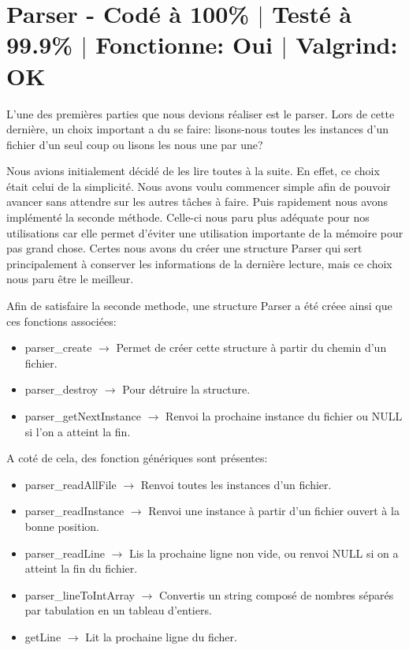 \documentclass{EPUProjetPeiP}
\newcommand{\comp}[5]{
	\section[#1]{#1 {\small - Codé à #2\% $\vert$ Testé à #3\% $\vert$ Fonctionne: #4 $\vert$ Valgrind: #5}}
}
\begin{document}
\comp{Parser}{100}{99.9}{Oui}{OK}
L'une des premières parties que nous devions réaliser est le parser. Lors de cette dernière, un choix important a du se faire: lisons-nous toutes les instances d'un fichier d'un seul coup ou lisons les nous une par une?

Nous avions initialement décidé de les lire toutes à la suite. En effet, ce choix était celui de la simplicité. Nous avons voulu commencer simple afin de pouvoir avancer sans attendre sur les autres tâches à faire. Puis rapidement nous avons implémenté la seconde méthode. Celle-ci nous paru plus adéquate pour nos utilisations car elle permet d'éviter une utilisation importante de la mémoire pour pas grand chose. Certes nous avons du créer une structure Parser qui sert principalement à conserver les informations de la dernière lecture, mais ce choix nous paru être le meilleur.

Afin de satisfaire la seconde methode, une structure Parser a été créee ainsi que ces fonctions associées:
\begin{itemize}
	\item parser\_create $\longrightarrow$ Permet de créer cette structure à partir du chemin d'un fichier.
	\item parser\_destroy $\longrightarrow$ Pour détruire la structure.
	\item parser\_getNextInstance $\longrightarrow$ Renvoi la prochaine instance du fichier ou NULL si l'on a atteint la fin.\\
\end{itemize}

A coté de cela, des fonction génériques sont présentes:
\begin{itemize}
	\item parser\_readAllFile $\longrightarrow$ Renvoi toutes les instances d'un fichier.
	\item parser\_readInstance $\longrightarrow$ Renvoi une instance à partir d'un fichier ouvert à la bonne position. 
	\item parser\_readLine $\longrightarrow$ Lis la prochaine ligne non vide, ou renvoi NULL si on a atteint la fin du fichier.
	\item parser\_lineToIntArray $\longrightarrow$ Convertis un string composé de nombres séparés par tabulation en un tableau d'entiers.
	\item getLine $\longrightarrow$ Lit la prochaine ligne du ficher.
\end{itemize}
\end{document}
